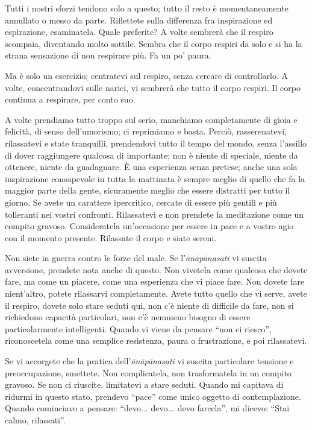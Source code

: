 Tutti i nostri sforzi tendono solo a questo; tutto il resto è
momentaneamente annullato o messo da parte. Riflettete sulla differenza
fra inspirazione ed espirazione, esaminatela. Quale preferite? A volte
sembrerà che il respiro scompaia, diventando molto sottile. Sembra che
il corpo respiri da solo e si ha la strana sensazione di non respirare
più. Fa un po' paura.

Ma è solo un esercizio; centratevi sul respiro, senza cercare di
controllarlo. A volte, concentrandovi sulle narici, vi sembrerà che
tutto il corpo respiri. Il corpo continua a respirare, per conto suo.

A volte prendiamo tutto troppo sul serio, manchiamo completamente di
gioia e felicità, di senso dell'umorismo; ci reprimiamo e basta. Perciò,
rasserenatevi, rilassatevi e state tranquilli, prendendovi tutto il
tempo del mondo, senza l'assillo di dover raggiungere qualcosa di
importante; non è niente di speciale, niente da ottenere, niente da
guadagnare. È una esperienza senza pretese; anche una sola inspirazione
consapevole in tutta la mattinata è sempre meglio di quello che fa la
maggior parte della gente, sicuramente meglio che essere distratti per
tutto il giorno. Se avete un carattere ipercritico, cercate di essere
più gentili e più tolleranti nei vostri confronti. Rilassatevi e non
prendete la meditazione come un compito gravoso. Consideratela
un'occasione per essere in pace e a vostro agio con il momento presente.
Rilassate il corpo e siate sereni.

Non siete in guerra contro le forze del male. Se l'\textit{ānāpānasati} vi
suscita avversione, prendete nota anche di questo. Non vivetela come
qualcosa che dovete fare, ma come un piacere, come una esperienza che vi
piace fare. Non dovete fare nient'altro, potete rilassarvi
completamente. Avete tutto quello che vi serve, avete il respiro, dovete
solo stare seduti qui, non c'è niente di difficile da fare, non si
richiedono capacità particolari, non c'è nemmeno bisogno di essere
particolarmente intelligenti. Quando vi viene da pensare ``non ci
riesco'', riconoscetela come una semplice resistenza, paura o
frustrazione, e poi rilassatevi.

Se vi accorgete che la pratica dell'\textit{ānāpānasati} vi suscita particolare
tensione e preoccupazione, smettete. Non complicatela, non trasformatela
in un compito gravoso. Se non ci riuscite, limitatevi a stare seduti.
Quando mi capitava di ridurmi in questo stato, prendevo ``pace'' come
unico oggetto di contemplazione. Quando cominciavo a pensare: ``devo...
devo... devo farcela'', mi dicevo: ``Stai calmo, rilassati''.

